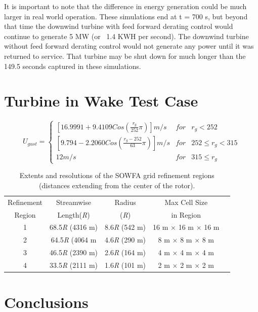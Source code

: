  It is important to note that the difference in energy generation could be much larger in real world operation. These simulations end at t = 700 s, but beyond that time the downwind turbine with feed forward derating control would continue to generate 5 MW (or ~1.4 KWH per second). The downwind turbine without feed forward derating control would not generate any power until it was returned to service. That turbine may be shut down for much longer than the 149.5 seconds captured in these simulations.

\section{Turbine in Wake Test Case} \label{section6-7}


\begin{equation} \label{eq6-4}
	U_{gust}=\left\{\begin{matrix}
\left [16.9991 +9.4109Cos\left ( \frac{r_g}{252 }\pi  \right )  \right ]m/s & for  & r_g<252\\ 
 \left [9.794 -2.2060Cos\left ( \frac{r_g-252}{63}\pi  \right )  \right ]m/s & for  & 252 \leq r_g <315\\ 
 12 m/s &  for & 315 \leq r_g
\end{matrix}\right. 
\end{equation}


\begin{table} \label{Table6-5}
\centering
\caption{ Extents and resolutions of the SOWFA grid refinement regions (distances extending from the center of the rotor).}
\begin{tabular}{c c c c c}
\hline
Refinement & Streamwise       & Radius     & Max Cell Size\\
Region     & Length(\emph{R}) & (\emph{R}) &  in Region\\
\hline
1          & 68.5\emph{R} (4316 m)  & 8.6\emph{R} (542 m) & 16 m $\times$ 16 m $\times$ 16 m\\
2          & 64.5\emph{R} (4064 m   & 4.6\emph{R} (290 m) & 8 m $\times$ 8 m $\times$ 8 m\\
3          & 46.5\emph{R} (2390 m)  & 2.6\emph{R} (164 m) & 4 m $\times$ 4 m $\times$ 4 m\\
4          & 33.5\emph{R} (2111 m)  & 1.6\emph{R} (101 m) & 2 m $\times$ 2 m $\times$ 2 m\\
\hline
\end{tabular}
\end{table}


\section{Conclusions} \label{section6-8}

